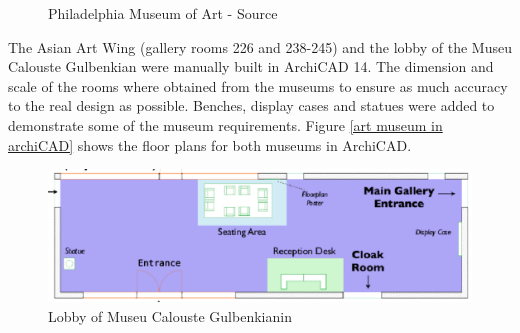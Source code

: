 \documentclass[12pt]{ucthesis}
\begin{document}
\begin{figure}[H]
 \centering
 \hspace{10 mm}
 \caption{Philadelphia Museum of Art - Source \cite{philadelphiamusem}}
\label{art-museums}
\end{figure}

The Asian Art Wing (gallery rooms 226 and 238-245) and the lobby of the Museu Calouste Gulbenkian were manually built in ArchiCAD 14. The dimension and scale of the rooms where obtained from the museums to ensure as much accuracy to the real design as possible. Benches, display cases and statues were added to demonstrate some of the museum requirements. Figure \ref{art museum in archiCAD} shows the floor plans for both museums in ArchiCAD.

\pagebreak

\begin{figure}[H]
\centering
\includegraphics[width=120mm]{lobby}
\caption{Lobby of Museu Calouste Gulbenkianin}
\label{lobby}
\end{figure}
\end{document}
